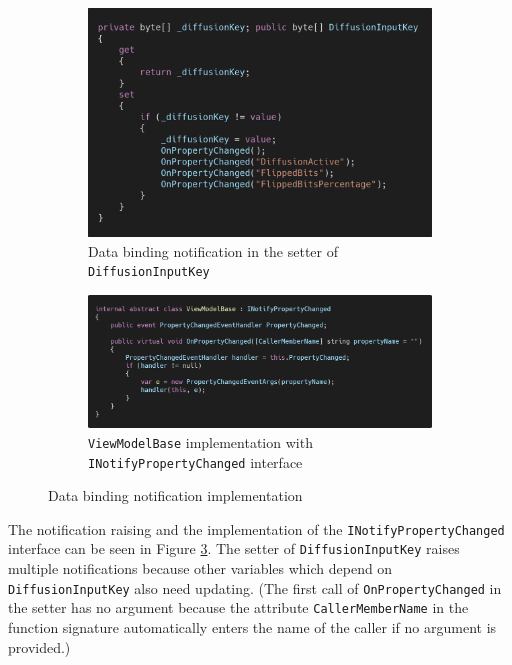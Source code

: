 \begin{figure}[!hbt]
\centering
\begin{subfigure}[t]{0.6\textwidth}
\centering
\includegraphics[width=\textwidth]{figures/code/mvvm-arch/onpropertychanged.png}
\caption{Data binding notification in the setter of \texttt{DiffusionInputKey}}
\label{fig:mvvm.onpropertychanged}
\end{subfigure}
\begin{subfigure}[t]{\textwidth}
\centering
\includegraphics[width=\textwidth]{figures/code/mvvm-arch/viewmodelbase.png}
\caption{\texttt{ViewModelBase} implementation with \texttt{INotifyPropertyChanged} interface}
\label{fig:mvvm.viewmodelbase}
\end{subfigure}
\caption{Data binding notification implementation}
\label{fig:mvvm.databindingnotification}
\end{figure}

The notification raising and the implementation of the \texttt{INotifyPropertyChanged} interface can be seen in Figure \ref{fig:mvvm.databindingnotification}. The setter of \texttt{DiffusionInputKey} raises multiple notifications because other variables which depend on \texttt{DiffusionInputKey} also need updating. (The first call of \texttt{OnPropertyChanged}  in the setter has no argument because the attribute \texttt{CallerMemberName} in the function signature automatically enters the name of the caller if no argument is provided.)

